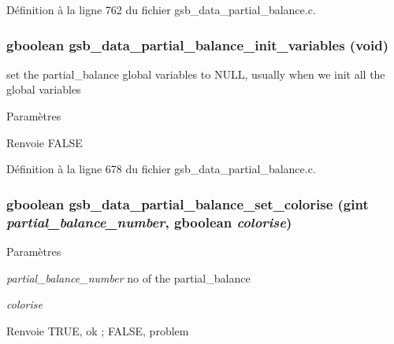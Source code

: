 Définition à la ligne 762 du fichier gsb\_\-data\_\-partial\_\-balance.c.

\subsubsection[{gsb\_\-data\_\-partial\_\-balance\_\-init\_\-variables}]{\setlength{\rightskip}{0pt plus 5cm}gboolean gsb\_\-data\_\-partial\_\-balance\_\-init\_\-variables (void)}\label{gsb__data__partial__balance_8h_a6f4eaeeee77c8cdf2080849eb4df9133}
set the partial\_\-balance global variables to NULL, usually when we init all the global variables


\begin{DoxyParams}{Paramètres}
\item[{\em }]\end{DoxyParams}
\begin{DoxyReturn}{Renvoie}
FALSE 
\end{DoxyReturn}


Définition à la ligne 678 du fichier gsb\_\-data\_\-partial\_\-balance.c.

\subsubsection[{gsb\_\-data\_\-partial\_\-balance\_\-set\_\-colorise}]{\setlength{\rightskip}{0pt plus 5cm}gboolean gsb\_\-data\_\-partial\_\-balance\_\-set\_\-colorise (gint {\em partial\_\-balance\_\-number}, \/  gboolean {\em colorise})}\label{gsb__data__partial__balance_8h_a1089db03152e013649c65d8d8778396c}

\begin{DoxyParams}{Paramètres}
\item[{\em partial\_\-balance\_\-number}]no of the partial\_\-balance \item[{\em colorise}]\end{DoxyParams}
\begin{DoxyReturn}{Renvoie}
TRUE, ok ; FALSE, problem 
\end{DoxyReturn}



